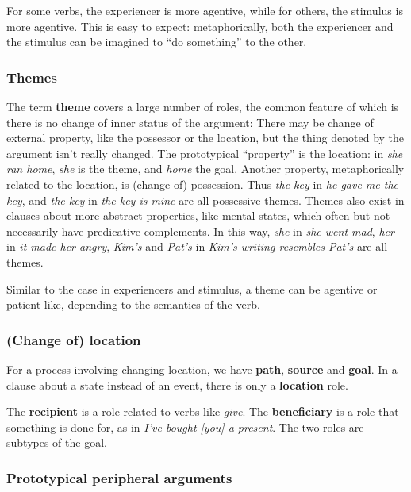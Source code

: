 \documentclass[UTF8, a4paper, oneside, scheme=plain]{ctexrep}
\newcommand*{\concept}[1]{\textbf{#1}}
\newcommand{\corpus}[1]{\emph{#1}}
\begin{document}
For some verbs, the experiencer is more agentive, while for others, the stimulus is more agentive.
This is easy to expect:
metaphorically, both the experiencer and the stimulus can be imagined to ``do something'' to the other.

\subsubsection{Themes}

The term \concept{theme} covers a large number of roles,
the common feature of which is there is no change of inner status of the argument:
There may be change of external property, like the possessor or the location,
but the thing denoted by the argument isn't really changed.
The prototypical ``property'' is the location: 
in \corpus{she ran home}, \corpus{she} is the theme, and \corpus{home} the goal.
Another property, metaphorically related to the location, is (change of) possession.
Thus \corpus{the key} in \corpus{he gave me the key}, and \corpus{the key} in \corpus{the key is mine}
are all possessive themes.
Themes also exist in clauses about more abstract properties, like mental states, 
which often but not necessarily have predicative complements.
In this way, 
\corpus{she} in \corpus{she went mad}, 
\corpus{her} in \corpus{it made her angry},
\corpus{Kim's} and \corpus{Pat's} in \corpus{Kim's writing resembles Pat's}
are all themes.

Similar to the case in experiencers and stimulus,
a theme can be agentive or patient-like, depending to the semantics of the verb.

\subsubsection{(Change of) location}

For a process involving changing location,
we have \concept{path}, \concept{source} and \concept{goal}.
In a clause about a state instead of an event,
there is only a \concept{location} role.

The \concept{recipient} is a role related to verbs like \corpus{give}.
The \concept{beneficiary} is a role that something is done for,
as in \corpus{I've bought [you] a present}.
The two roles are subtypes of the goal.

\subsubsection{Prototypical peripheral arguments}
\end{document}
